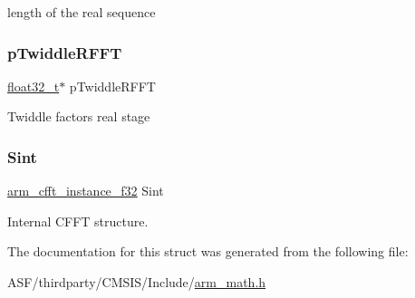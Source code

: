 length of the real sequence \mbox{\label{structarm__rfft__fast__instance__f32_a43370fe848d06993faf834da07ca91ce}} 
\subsubsection{\texorpdfstring{pTwiddleRFFT}{pTwiddleRFFT}}
{\footnotesize\ttfamily \mbox{\hyperlink{arm__math_8h_a4611b605e45ab401f02cab15c5e38715}{float32\+\_\+t}}$\ast$ p\+Twiddle\+R\+F\+FT}

Twiddle factors real stage \mbox{\label{structarm__rfft__fast__instance__f32_aa8a05a9fabc3852e5d476152a5067e53}} 
\subsubsection{\texorpdfstring{Sint}{Sint}}
{\footnotesize\ttfamily \mbox{\hyperlink{structarm__cfft__instance__f32}{arm\+\_\+cfft\+\_\+instance\+\_\+f32}} Sint}

Internal C\+F\+FT structure. 

The documentation for this struct was generated from the following file\+:\begin{DoxyCompactItemize}
\item 
A\+S\+F/thirdparty/\+C\+M\+S\+I\+S/\+Include/\mbox{\hyperlink{arm__math_8h}{arm\+\_\+math.\+h}}\end{DoxyCompactItemize}
